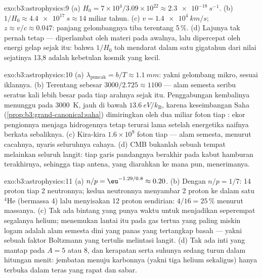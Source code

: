 \begin{solution}{exo:b3:astrophysics:9}
(a) $H_0 = 7\times10^4/3.09\times10^{22} \approx
\qty{2.3e-18}{s^{-1}}$. (b) $1/H_0 \approx \qty{4.4e17}{s}
\approx 14$ miliar tahun. (c) $v = \qty{1.4e4}{km/s}$;
$z \approx v/c \approx 0.047$: panjang gelombangnya tiba terentang
5\,\%. (d) Lajunya tak pernah tetap --- diperlambat oleh
materi pada awalnya, lalu dipercepat oleh energi gelap sejak itu: bahwa
$1/H_0$ toh mendarat dalam satu gigatahun dari nilai sejatinya 13,8 adalah
kebetulan kosmik yang kecil.
\end{solution}

\begin{solution}{exo:b3:astrophysics:10}
(a) $\lambda_{\text{puncak}} = b/T \approx \qty{1.1}{mm}$:
yakni gelombang mikro, sesuai iklannya. (b) Terentang sebesar $3000/2.725 \approx
1100$ --- alam semesta seribu seratus kali lebih besar pada tiap
arahnya sejak itu. Penggabungan kembalinya menunggu pada \qty{3000}{K}, jauh
di bawah $\qty{13.6}{eV}/k_{\text{B}}$, karena keseimbangan Saha
(\cref{prop:b3:grand-canonical:saha}) dimiringkan oleh dua miliar
foton tiap : ekor pengionnya menjaga hidrogennya tetap terurai
lama setelah energetika naifnya berkata sebaliknya. (c) Kira-kira
$1.6\times10^{9}$ foton tiap  --- alam semesta, menurut
cacahnya, nyaris seluruhnya cahaya. (d) CMB bukanlah sebuah tempat melainkan
seluruh langit: tiap garis pandangnya berakhir pada kabut hamburan
terakhirnya, sehingga tiap antena, yang diarahkan ke mana pun, menerimanya.
\end{solution}

\begin{solution}{exo:b3:astrophysics:11}
(a) $n/p = \eu^{-1.29/0.8} \approx 0.20$. (b) Dengan $n/p = 1/7$:
14 proton tiap 2 neutronnya; kedua neutronnya menyambar 2 proton ke dalam
satu $^4$He (bermassa 4) lalu menyisakan 12 proton sendirian: $4/16 = 25\,\%$ menurut
massanya. (c) Tak ada bintang yang punya waktu untuk menjadikan seperempat segalanya
helium; menemukan lantai itu pada gas tertua yang paling miskin logam
adalah alam semesta dini yang panas yang tertangkap basah --- yakni sebuah faktor
Boltzmann yang tertulis melintasi langit. (d) Tak ada inti yang mantap
pada $A = 5$ atau $8$, dan kerapatan serta suhunya sedang
turun dalam hitungan menit: jembatan menuju karbonnya (yakni tiga helium
sekaligus) hanya terbuka dalam teras  yang rapat dan sabar.
\end{solution}

